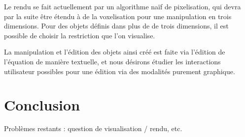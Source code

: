 \documentclass[french,12pt]{article}
\begin{document}
Le rendu se fait actuellement par un algorithme naïf de pixelisation, qui devra par la suite être étendu à de la voxelisation pour une manipulation en trois dimensions. Pour des objets définis dans plus de de trois dimensions, il est possible de choisir la restriction que l'on visualise. 

La manipulation et l'édition des objets ainsi créé est faite via l'édition de l'équation de manière textuelle, et nous désirons étudier les interactions utilisateur possibles pour une édition via des modalités purement graphique. 


\section{Conclusion}

Problèmes restants : question de visualisation / rendu, etc.
\end{document}
